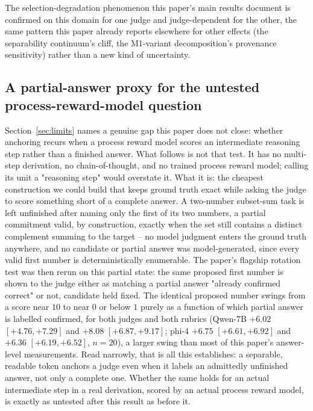 \documentclass[11pt]{article}
\begin{document}
The selection-degradation phenomenon this paper's main results document is confirmed on this domain for one judge and judge-dependent for the other, the same pattern this paper already reports elsewhere for other effects (the separability continuum's cliff, the M1-variant decomposition's provenance sensitivity) rather than a new kind of uncertainty.

\subsection{A partial-answer proxy for the untested process-reward-model question}
\label{sec:appendix-steplevel}

Section~\ref{sec:limits} names a genuine gap this paper does not close: whether anchoring recurs when a process reward model scores an intermediate reasoning step rather than a finished answer. What follows is not that test. It has no multi-step derivation, no chain-of-thought, and no trained process reward model; calling its unit a "reasoning step" would overstate it. What it is: the cheapest construction we could build that keeps ground truth exact while asking the judge to score something short of a complete answer. A two-number subset-sum task is left unfinished after naming only the first of its two numbers, a partial commitment valid, by construction, exactly when the set still contains a distinct complement summing to the target -- no model judgment enters the ground truth anywhere, and no candidate or partial answer was model-generated, since every valid first number is deterministically enumerable. The paper's flagship rotation test was then rerun on this partial state: the same proposed first number is shown to the judge either as matching a partial answer "already confirmed correct" or not, candidate held fixed. The identical proposed number swings from a score near $10$ to near $0$ or below $1$ purely as a function of which partial answer is labelled confirmed, for both judges and both rubrics (Qwen-7B $+6.02$ $[+4.76,+7.29]$ and $+8.08$ $[+6.87,+9.17]$; phi-4 $+6.75$ $[+6.61,+6.92]$ and $+6.36$ $[+6.19,+6.52]$, $n{=}20$), a larger swing than most of this paper's answer-level measurements. Read narrowly, that is all this establishes: a separable, readable token anchors a judge even when it labels an admittedly unfinished answer, not only a complete one. Whether the same holds for an actual intermediate step in a real derivation, scored by an actual process reward model, is exactly as untested after this result as before it.

\enlargethispage{4\baselineskip}
{\small


}
\end{document}
